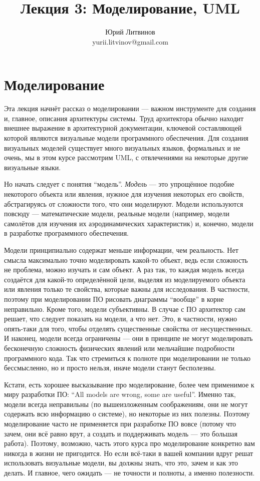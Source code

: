\documentclass[a5paper]{article}
\title{Лекция 3: Моделирование, UML}
\author{Юрий Литвинов\\\small{yurii.litvinov@gmail.com}}
\date{}
\begin{document}
\maketitle
\thispagestyle{empty}

\section{Моделирование}

Эта лекция начнёт рассказ о моделировании --- важном инструменте для создания и, главное, описания архитектуры системы. Труд архитектора обычно находит внешнее выражение в архитектурной документации, ключевой составляющей которой являются визуальные модели программного обеспечения. Для создания визуальных моделей существует много визуальных языков, формальных и не очень, мы в этом курсе рассмотрим UML, с отвлечениями на некоторые другие визуальные языки.

Но начать следует с понятия ``модель''. \textit{Модель} --- это упрощённое подобие некоторого объекта или явления, нужное для изучения некоторых его свойств, абстрагируясь от сложности того, что они моделируют. Модели используются повсюду --- математические модели, реальные модели (например, модели самолётов для изучения их аэродинамических характеристик) и, конечно, модели в разработке программного обеспечения.

Модели принципиально содержат меньше информации, чем реальность. Нет смысла максимально точно моделировать какой-то объект, ведь если сложность не проблема, можно изучать и сам объект. А раз так, то каждая модель всегда создаётся для какой-то определённой цели, выделяя из моделируемого объекта или явления только те свойства, которые важны для исследования. В частности, поэтому при моделировании ПО рисовать диаграммы ``вообще'' в корне неправильно. Кроме того, модели субъективны. В случае с ПО архитектор сам решает, что следует показать на модели, а что нет. Это, в частности, нужно опять-таки для того, чтобы отделять существенные свойства от несущественных. И наконец, модели всегда ограничены --- они в принципе не могут моделировать бесконечную сложность физических явлений или мельчайшие подробности программного кода. Так что стремиться к полноте при моделировании не только бессмысленно, но и просто нельзя, иначе модели станут бесполезны.

Кстати, есть хорошее высказывание про моделирование, более чем применимое к миру разработки ПО: ``All models are wrong, some are useful''. Именно так, модели всегда неправильны (по вышеизложенным соображениям, они не могут содержать всю информацию о системе), но некоторые из них полезны. Поэтому моделирование часто не применяется при разработке ПО вовсе (потому что зачем, они всё равно врут, а создать и поддерживать модель --- это большая работа). Поэтому, возможно, часть этого курса про моделирование конкретно вам никогда в жизни не пригодится. Но если всё-таки в вашей компании вдруг решат использовать визуальные модели, вы должны знать, что это, зачем и как это делать. И главное, чего ожидать --- не точности и полноты, а именно полезности.
\end{document}
